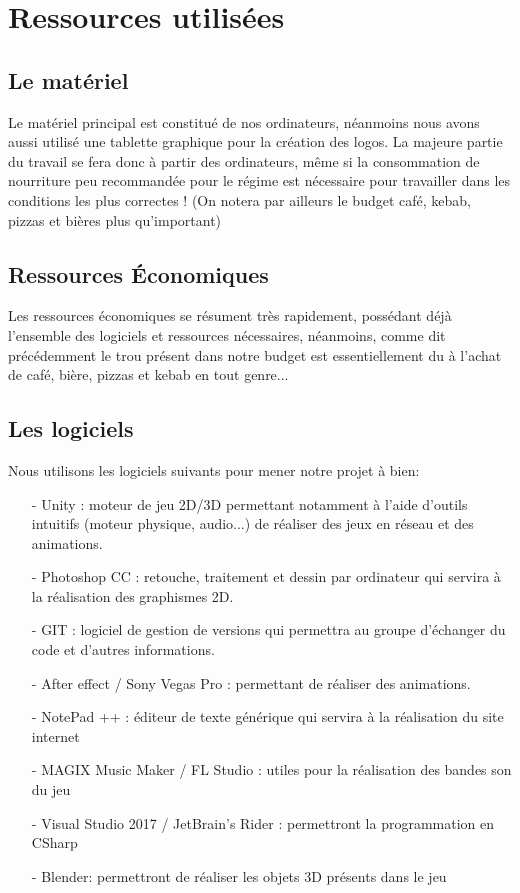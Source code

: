 \documentclass[12pt,a4paper]{article}
\begin{document}
\newpage

\section{Ressources utilisées}
\subsection{Le matériel}
Le matériel principal est constitué de nos ordinateurs, néanmoins nous avons aussi utilisé une tablette graphique
pour la création des logos.
La majeure partie du travail se fera donc à partir des ordinateurs, même si la consommation de nourriture
peu recommandée pour le régime est nécessaire pour travailler dans les conditions les plus correctes ! (On notera par ailleurs le budget café, kebab, pizzas et bières plus qu'important)

\subsection{Ressources Économiques}
Les ressources économiques se résument très rapidement, possédant déjà l'ensemble des logiciels et ressources nécessaires, néanmoins, comme dit précédemment le trou présent dans notre budget est essentiellement du à l'achat de café, bière, pizzas et kebab en tout genre...

\newpage

\subsection{Les logiciels}
Nous utilisons les logiciels suivants pour mener notre projet à bien:
\begin{itemize}
\item[-] Unity : moteur de jeu 2D/3D permettant notamment à l'aide d'outils
intuitifs (moteur physique, audio...) de réaliser des jeux en réseau et
des animations.
\item[-] Photoshop CC : retouche, traitement et dessin par
ordinateur qui servira à la réalisation des graphismes 2D.
\item[-] GIT : logiciel de gestion de versions qui permettra au groupe d'échanger du code et d’autres informations.
\item[-] After effect / Sony Vegas Pro : permettant de réaliser des animations.
\item[-] NotePad ++ : éditeur de texte générique qui servira à la réalisation
du site internet
\item[-] MAGIX Music Maker / FL Studio : utiles pour la
réalisation des bandes son du jeu
\item[-] Visual Studio 2017 / JetBrain's Rider : permettront la programmation en CSharp
\item[-] Blender: permettront de réaliser les objets 3D présents dans le jeu
\end{itemize}
\end{document}
